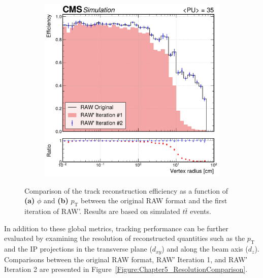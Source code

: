 \begin{figure}[h]
        \vspace{0.5cm}

        \begin{subfigure}{0.49\textwidth}
            \centering
            \includegraphics[width=\textwidth]{Figures/Chapter5/efficiency_comparison_2_vertpos.pdf}
            \caption{}
        \end{subfigure}
    \caption[Comparison of the track reconstruction efficiency as a function of $\phi$ and $p_\mathrm{T}$ between the original RAW format and the first iteration of RAW'.]{Comparison of the track reconstruction efficiency as a function of \textbf{(a)} $\phi$ and \textbf{(b)} $p_\mathrm{T}$ between the original RAW format and the first iteration of RAW'. Results are based on simulated $t\bar{t}$ events.} 
    \label{Figure:Chapter5_TrackingPerformance_2}
\end{figure}

In addition to these global metrics, tracking performance can be further evaluated by
examining the resolution of reconstructed quantities such as the $p_\mathrm{T}$ and the IP projections in the transverse plane ($d_{xy}$) and along the beam axis ($d_z$). Comparisons between the original RAW format, RAW′ Iteration 1, and RAW′ Iteration 2 are presented in Figure~\ref{Figure:Chapter5_ResolutionComparison}.

